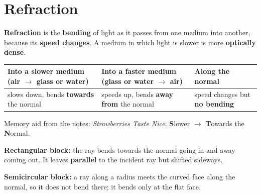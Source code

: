 \documentclass[11pt]{article}
\begin{document}
\section{Refraction}\label{sec:refraction}
\textbf{Refraction} is the \textbf{bending} of light as it passes from one medium into another, because its \textbf{speed changes}. A medium in which light is slower is more \textbf{optically dense}.
\begin{center}\FigRefractRules[5mm]\end{center}
\begin{tabularx}{\textwidth}{@{}X X X@{}}
\toprule
\textbf{Into a slower medium} (air $\to$ glass or water) & \textbf{Into a faster medium} (glass or water $\to$ air) & \textbf{Along the normal}\\
\midrule
slows down, bends \textbf{towards} the normal & speeds up, bends \textbf{away from} the normal & speed changes but \textbf{no bending}\\
\bottomrule
\end{tabularx}
Memory aid from the notes: \emph{Strawberries Taste Nice}: \textbf{S}lower $\to$ \textbf{T}owards the \textbf{N}ormal.

\begin{minipage}[t]{0.49\textwidth}
\vspace{0pt}\centering
{}\par\medskip
\raggedright\small\textbf{Rectangular block:} the ray bends towards the normal going in and away coming out. It leaves \textbf{parallel} to the incident ray but shifted sideways.
\end{minipage}\hfill
\begin{minipage}[t]{0.49\textwidth}
\vspace{0pt}\centering
\FigSemi[5mm]\par\medskip
\raggedright\small\textbf{Semicircular block:} a ray along a radius meets the curved face along the normal, so it does not bend there; it bends only at the flat face.
\end{minipage}
\end{document}
